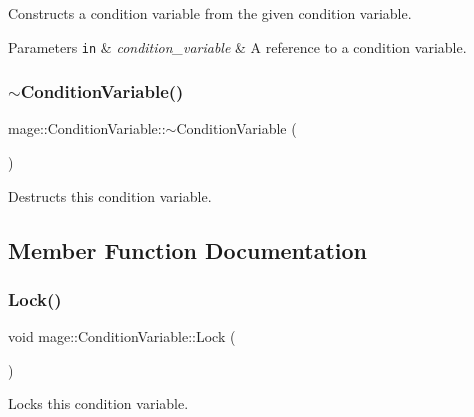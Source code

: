 Constructs a condition variable from the given condition variable.


\begin{DoxyParams}[1]{Parameters}
\mbox{\tt in}  & {\em condition\+\_\+variable} & A reference to a condition variable. \\
\hline
\end{DoxyParams}
\hypertarget{classmage_1_1_condition_variable_accd5253beb65b2904428afdb889cf00b}{}\label{classmage_1_1_condition_variable_accd5253beb65b2904428afdb889cf00b} 
\subsubsection{\texorpdfstring{$\sim$\+Condition\+Variable()}{~ConditionVariable()}}
{\footnotesize\ttfamily mage\+::\+Condition\+Variable\+::$\sim$\+Condition\+Variable (\begin{DoxyParamCaption}{ }\end{DoxyParamCaption})}

Destructs this condition variable. 

\subsection{Member Function Documentation}
\hypertarget{classmage_1_1_condition_variable_acb0fa4a842b6979ac35c70dab0f43813}{}\label{classmage_1_1_condition_variable_acb0fa4a842b6979ac35c70dab0f43813} 
\subsubsection{\texorpdfstring{Lock()}{Lock()}}
{\footnotesize\ttfamily void mage\+::\+Condition\+Variable\+::\+Lock (\begin{DoxyParamCaption}{ }\end{DoxyParamCaption})}

Locks this condition variable. \hypertarget{classmage_1_1_condition_variable_ac83eae5353cd004ee06fe2376e5bdbf4}{}\label{classmage_1_1_condition_variable_ac83eae5353cd004ee06fe2376e5bdbf4} 
